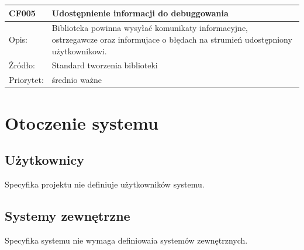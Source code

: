 \documentclass[a4paper,10pt]{article}
\begin{document}
\begin{center}
\begin{tabular}{|m{3cm}|m{9cm}|}
 \hline

CF005 & Udostępnienie informacji do debuggowania  \\ \hline
Opis: &  Biblioteka powinna wysyłać komunikaty informacyjne, ostrzegawcze oraz informujace o błędach na strumień udostępniony użytkownikowi.  \\ \hline
Źródło: & Standard tworzenia biblioteki \cite{artOstandardach} \\ \hline
Priorytet: & średnio ważne \\ \hline

\end{tabular}

\end{center}

\section{Otoczenie systemu}


\subsection{Użytkownicy}

Specyfika projektu nie definiuje użytkowników systemu.





\subsection{Systemy zewnętrzne}

Specyfika systemu nie wymaga definiowaia systemów zewnętrznych.
\end{document}
